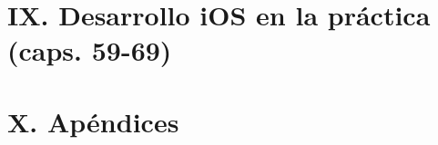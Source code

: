 \documentclass[11pt,a4paper,openany]{book}
\begin{document}
\part*{IX. Desarrollo iOS en la práctica (caps. 59-69)}











\appendix
\part*{X. Apéndices}









\end{document}
